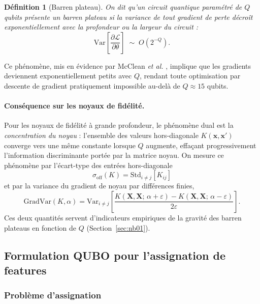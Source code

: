 \documentclass[12pt,a4paper]{article}
\newtheorem{definition}{Définition}[section]
\begin{document}
\begin{definition}[Barren plateau]
On dit qu'un circuit quantique paramétré de $Q$ qubits présente un
\emph{barren plateau} si la variance de tout gradient de perte décroît
exponentiellement avec la profondeur ou la largeur du circuit :
\begin{equation}
  \mathrm{Var}\!\left[\frac{\partial \mathcal{L}}{\partial \theta}\right]
  \;\sim\; O\!\left(2^{-Q}\right).
  \label{eq:bp}
\end{equation}
\end{definition}

Ce phénomène, mis en évidence par McClean \emph{et al.} \cite{mcclean2018},
implique que les gradients deviennent exponentiellement petits avec $Q$,
rendant toute optimisation par descente de gradient pratiquement impossible
au-delà de $Q \approx 15$ qubits.

\paragraph{Conséquence sur les noyaux de fidélité.}
Pour les noyaux de fidélité à grande profondeur, le phénomène dual est la
\emph{concentration du noyau} : l'ensemble des valeurs hors-diagonale
$K(\bm{x}, \bm{x}')$ converge vers une même constante lorsque $Q$ augmente,
effaçant progressivement l'information discriminante portée par la matrice
noyau.
On mesure ce phénomène par l'écart-type des entrées hors-diagonale
\begin{equation}
  \sigma_{\mathrm{off}}(K) = \mathrm{Std}_{i \neq j}\!\left[K_{ij}\right]
\end{equation}
et par la variance du gradient de noyau par différences finies,
\begin{equation}
  \mathrm{GradVar}(K, \alpha) =
  \mathrm{Var}_{i \neq j}\!\left[
  \frac{K(\bm{X},\bm{X};\,\alpha+\varepsilon)
       -K(\bm{X},\bm{X};\,\alpha-\varepsilon)}{2\varepsilon}
  \right].
\end{equation}
Ces deux quantités servent d'indicateurs empiriques de la gravité des
barren plateaus en fonction de $Q$ (Section~\ref{sec:nb01}).

\subsection{Formulation QUBO pour l'assignation de features}
\label{sec:qubo_theory}

\subsubsection{Problème d'assignation}
\end{document}
